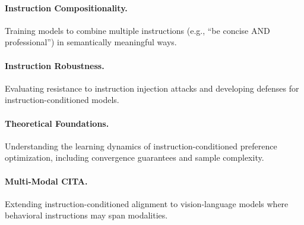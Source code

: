 \paragraph{Instruction Compositionality.} Training models to combine multiple instructions (e.g., ``be concise AND professional'') in semantically meaningful ways.

\paragraph{Instruction Robustness.} Evaluating resistance to instruction injection attacks and developing defenses for instruction-conditioned models.

\paragraph{Theoretical Foundations.} Understanding the learning dynamics of instruction-conditioned preference optimization, including convergence guarantees and sample complexity.

\paragraph{Multi-Modal CITA.} Extending instruction-conditioned alignment to vision-language models where behavioral instructions may span modalities.
